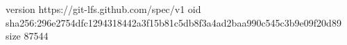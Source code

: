 version https://git-lfs.github.com/spec/v1
oid sha256:296e2754dfc1294318442a3f15b81c5db8f3a4ad2baa990c545c3b9e09f20d89
size 87544
